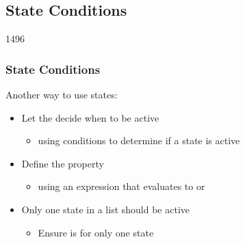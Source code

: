 %
%
%
%

\subsection{State Conditions}


\begin{slide}{1496}\frametitle{State Conditions}

Another way to use states:

\begin{itemize}
\item Let the  decide when to be active
  \begin{itemize}
  \item using conditions to determine if a state is active
  \end{itemize}
\item Define the  property
  \begin{itemize}
  \item using an expression that evaluates to  or
  \end{itemize}
\item Only one state in a  list should be active
  \begin{itemize}
  \item Ensure  is  for only one state
  \end{itemize}
\end{itemize}





\end{slide}

